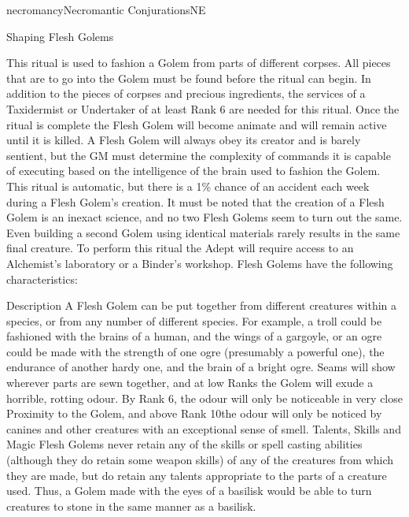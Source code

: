 \begin{College}[1.1]{necromancy}{Necromantic Conjurations}{NE}
\begin{ritual}[R-4]{Shaping Flesh Golems}
\begin{effects}
This ritual is used to fashion a Golem from parts of different
corpses. All pieces that are to go into the Golem must be found before
the ritual can begin.  In addition to the pieces of corpses and
precious ingredients, the services of a Taxidermist or Undertaker of
at least Rank 6 are needed for this ritual. Once the ritual is
complete the Flesh Golem will become animate and will remain active
until it is killed. A Flesh Golem will always obey its creator and is
barely sentient, but the GM must determine the complexity of commands
it is capable of executing based on the intelligence of the brain used
to fashion the Golem. This ritual is automatic, but there is a 1\%
chance of an accident each week during a Flesh Golem’s creation.  It
must be noted that the creation of a Flesh Golem is an inexact
science, and no two Flesh Golems seem to turn out the same.  Even
building a second Golem using identical materials rarely results in
the same final creature.  To perform this ritual the Adept will
require access to an Alchemist’s laboratory or a Binder’s
workshop. Flesh Golems have the following characteristics:

\begin{Description}
\item[Description] A Flesh Golem can be put together from different
  creatures within a species, or from any number of different
  species. For example, a troll could be fashioned with the brains of
  a human, and the wings of a gargoyle, or an ogre could be made with
  the strength of one ogre (presumably a powerful one), the endurance
  of another hardy one, and the brain of a bright ogre. Seams will
  show wherever parts are sewn together, and at low Ranks the Golem
  will exude a horrible, rotting odour. By Rank 6, the odour will only
  be noticeable in very close Proximity to the Golem, and above Rank
  10the odour will only be noticed by canines and other creatures with
  an exceptional sense of smell.  Talents, Skills and Magic Flesh
  Golems never retain any of the skills or spell casting abilities
  (although they do retain some weapon skills) of any of the creatures
  from which they are made, but do retain any talents appropriate to
  the parts of a creature used. Thus, a Golem made with the eyes of a
  basilisk would be able to turn creatures to stone in the same manner
  as a basilisk.


\end{Description}
\end{effects}
\end{ritual}
\end{College}
